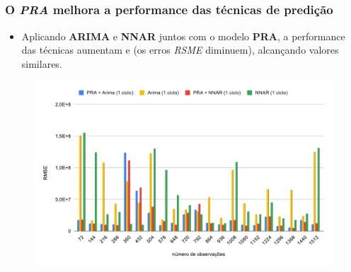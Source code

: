 \documentclass[aspectratio=169]{beamer}
\begin{document}
\subsection{}
\begin{frame}
\frametitle{O \textbf{\textit{PRA}} melhora a performance das técnicas de predição}
\small

\begin{itemize}\footnotesize
 \item Aplicando \textbf{ARIMA} e \textbf{NNAR} juntos com o modelo \textbf{PRA}, a performance das técnicas aumentam e (os erros \textit{RSME} diminuem), alcançando valores similares.
\end{itemize}

\vspace{-0.3cm}%

\centering
\begin{figure}[!htb]
\centering
\includegraphics[height=0.44\textwidth,angle=0]{rmse_PRA_original_juntos-eps-converted-to.pdf}
\end{figure}

\end{frame}

\end{document}
